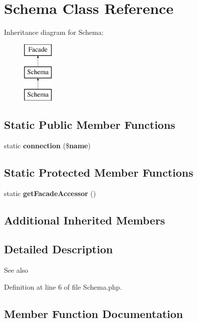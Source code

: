 \section{Schema Class Reference}
\label{class_illuminate_1_1_support_1_1_facades_1_1_schema}
Inheritance diagram for Schema\+:\begin{figure}[H]
\begin{center}
\leavevmode
\includegraphics[height=3.000000cm]{class_illuminate_1_1_support_1_1_facades_1_1_schema}
\end{center}
\end{figure}
\subsection*{Static Public Member Functions}
\begin{DoxyCompactItemize}
\item 
static {\bf connection} (\${\bf name})
\end{DoxyCompactItemize}
\subsection*{Static Protected Member Functions}
\begin{DoxyCompactItemize}
\item 
static {\bf get\+Facade\+Accessor} ()
\end{DoxyCompactItemize}
\subsection*{Additional Inherited Members}


\subsection{Detailed Description}
\begin{DoxySeeAlso}{See also}

\end{DoxySeeAlso}


Definition at line 6 of file Schema.\+php.



\subsection{Member Function Documentation}
